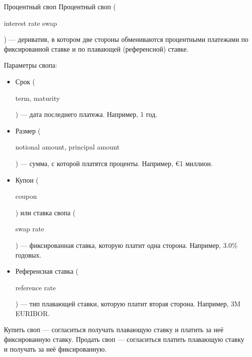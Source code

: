 \documentclass{beamer}
\renewcommand{\EUR}[1]{\textup{\euro}#1}
\newcommand{\en}[1]{\begin{otherlanguage}{english}#1\end{otherlanguage}}
\begin{document}
\begin{frame}{Процентный своп}
\justify
\alert{Процентный своп} (\en{interest rate swap}) --- дериватив, в котором две стороны 
обмениваются процентными платежами по фиксированной ставке и по плавающей (референсной) 
ставке. 

\justify
Параметры свопа:
\begin{itemize}
\justifying
\item Срок (\en{term, maturity}) --- дата последнего платежа. Например, 1 год.
\item Размер (\en{notional amount, principal amount}) --- сумма, с которой платятся проценты. Например, \EUR{1} миллион.
\item Купон (\en{coupon}) или ставка свопа (\en{swap rate}) --- фиксированная ставка, которую платит одна сторона. Например, $3.0\%$ годовых.
\item Референсная ставка (\en{reference rate}) --- тип плавающей ставки, которую платит вторая сторона. Например, 3M EURIBOR.
\end{itemize}

\justify
Купить своп --- согласиться получать плавающую ставку и платить за неё фиксированную ставку. Продать своп --- согласиться платить плавающую ставку и получать за неё фиксированную.
\end{frame}
\end{document}
